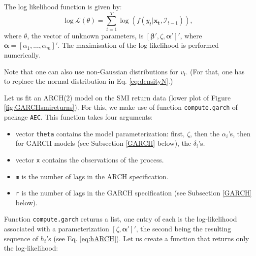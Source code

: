 \documentclass[
  12pt,
]{book}
\newenvironment{Shaded}{\begin{snugshade}}{\end{snugshade}}
\newcommand{\CommentTok}[1]{\textcolor[rgb]{0.56,0.35,0.01}{\textit{#1}}}
\newcommand{\ControlFlowTok}[1]{\textcolor[rgb]{0.13,0.29,0.53}{\textbf{#1}}}
\newcommand{\FunctionTok}[1]{\textcolor[rgb]{0.00,0.00,0.00}{#1}}
\newcommand{\NormalTok}[1]{#1}
\newcommand{\OtherTok}[1]{\textcolor[rgb]{0.56,0.35,0.01}{#1}}
\newcommand{\SpecialCharTok}[1]{\textcolor[rgb]{0.00,0.00,0.00}{#1}}
\providecommand{\tightlist}{%
  \setlength{\itemsep}{0pt}\setlength{\parskip}{0pt}}
\theoremstyle{definition}
\theoremstyle{definition}
\theoremstyle{definition}
\theoremstyle{definition}
\theoremstyle{remark}
\begin{document}
The log likelihood function is given by:
\[
\log \mathcal{L}(\theta) = \sum_{t=1}^T \log(f(y_t|\mathbf{x_t},\mathcal{I}_{t-1})),
\]
where \(\theta\), the vector of unknown parameters, is \([\boldsymbol\beta',\zeta,\boldsymbol\alpha']'\), where \(\boldsymbol\alpha=[\alpha_1,\dots,\alpha_m]'\). The maximisation of the log likelihood is performed numerically.

Note that one can also use non-Gaussian distributions for \(v_t\). (For that, one has to replace the normal distribution in Eq. \eqref{eq:densityN}.)

Let us fit an ARCH(2) model on the SMI return data (lower plot of Figure \ref{fig:GARCHsmireturns}). For this, we make use of function \texttt{compute.garch} of package \texttt{AEC}. This function takes four arguments:

\begin{itemize}
\tightlist
\item
  vector \texttt{theta} contains the model parameterization: first, \(\zeta\), then the \(\alpha_i\)'s, then for GARCH models (see Subsection \ref{GARCH} below), the \(\delta_i\)'s.
\item
  vector \texttt{x} contains the observations of the process.
\item
  \texttt{m} is the number of lags in the ARCH specification.
\item
  \texttt{r} is the number of lags in the GARCH specification (see Subsection \ref{GARCH} below).
\end{itemize}

Function \texttt{compute.garch} returns a list, one entry of each is the log-likelihood associated with a parameterization \([\zeta,\boldsymbol\alpha']'\), the second being the resulting sequence of \(h_t\)'s (see Eq. \eqref{eq:hARCH}). Let us create a function that returns only the log-likelihood:

\begin{Shaded}
\end{Shaded}
\end{document}
